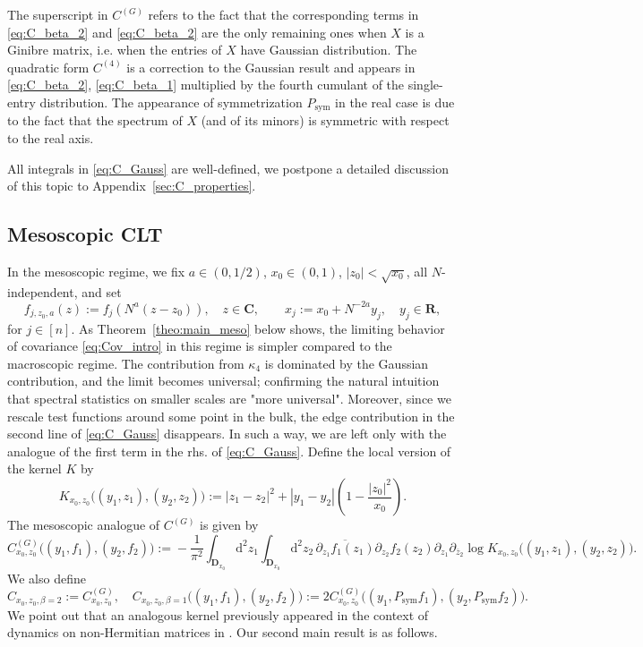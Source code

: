 \documentclass[10pt]{amsart}
\numberwithin{equation}{section}
\newcommand{\dif}{\mathrm{d}}
\newcommand{\R}{\mathbf{R}}
\newcommand{\C}{\mathbf{C}}
\newcommand{\DD}{\mathbf{D}}
\begin{document}
The superscript in $C^{(G)}$ refers to the fact that the corresponding terms in \eqref{eq:C_beta_2} and \eqref{eq:C_beta_2} are the only remaining ones when $X$ is a Ginibre matrix, i.e. when the entries of $X$ have Gaussian distribution. The quadratic form $C^{(4)}$ is a correction to the Gaussian result and appears in \eqref{eq:C_beta_2}, \eqref{eq:C_beta_1} multiplied by the fourth cumulant of the single-entry distribution. The appearance of symmetrization $P_{\mathrm{sym}}$ in the real case is due to the fact that the spectrum of $X$ (and of its minors) is symmetric with respect to the real axis.

All integrals in \eqref{eq:C_Gauss} are well-defined, we postpone a detailed discussion of this topic to Appendix~\ref{sec:C_properties}.


\subsection{Mesoscopic CLT}\label{sec:mesoCLT}


In the mesoscopic regime, we fix $a\in (0,1/2)$, $x_0\in(0,1)$, $|z_0|<\sqrt{x_0}$, all $N$-independent, and set
\begin{equation}
f_{j,z_0,a}(z):=f_j\left(N^a(z-z_0)\right),\quad z\in\C,\qquad x_j:=x_0+N^{-2a}y_j,\quad y_j\in\R,
\label{eq:meso_scaling}
\end{equation} 
for $j\in[n]$. As Theorem~\ref{theo:main_meso} below shows, the limiting behavior of covariance \eqref{eq:Cov_intro} in this regime is simpler compared to the macroscopic regime. The contribution from $\kappa_4$ is dominated by the Gaussian contribution, and the limit becomes universal; confirming the natural intuition that spectral statistics on smaller scales are "more universal". Moreover, since we rescale test functions around some point in the bulk, the edge contribution in the second line of \eqref{eq:C_Gauss} disappears. In such a way, we are left only with the analogue of the first term in the rhs. of \eqref{eq:C_Gauss}. Define the local version of the kernel $K$ by
\begin{equation}
K_{x_0,z_0}\big((y_1,z_1),(y_2,z_2)\big):= |z_1-z_2|^2 + |y_1-y_2| \left(1-\frac{|z_0|^2}{x_0}\right).
\end{equation}
The mesoscopic analogue of $C^{(G)}$ is given by
\begin{equation}
C^{(G)}_{x_0,z_0}\big((y_1,f_1),\!(y_2,f_2)\big)\!:=\! -\frac{1}{\pi^2}\!\int_{\DD_{x_0}}\!\!\!\!\!\dif^2 z_1\!\!\int_{\DD_{x_0}}\!\!\!\!\!\dif^2 z_2 \, \overline{\partial_{z_1} f_1(z_1)}\partial_{z_2} f_2(z_2) \partial_{z_1}\partial_{\overline{z}_2} \log K_{x_0,z_0}\big((y_1,z_1),\!(y_2,z_2)\big)\!.
\end{equation}
We also define 
\begin{equation}
C_{x_0,z_0,\beta=2}:=C_{x_0,z_0}^{(G)},\quad C_{x_0,z_0,\beta=1}\big((y_1,f_1),(y_2,f_2)\big):=2C_{x_0,z_0}^{(G)}\big((y_1,P_{\mathrm{sym}}f_1), (y_2,P_{\mathrm{sym}}f_2)\big).
\label{eq:C_beta_meso}
\end{equation}
We point out that an analogous kernel previously appeared in the context of dynamics on non-Hermitian matrices in \cite[Eq.(2.7)]{bourgade2024fluctuations}. Our second main result is as follows.
\end{document}
